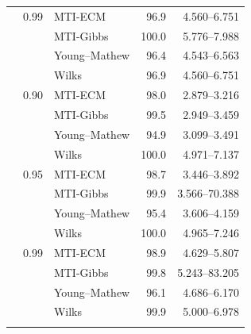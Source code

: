 \begin{longtable}{@{}rrlrr@{}}
\addlinespace[0.3em]
500 & 0.99 & MTI-ECM & 96.9 & 4.560--6.751 \\
 &  & MTI-Gibbs & 100.0 & 5.776--7.988 \\
 &  & Young--Mathew & 96.4 & 4.543--6.563 \\
 &  & Wilks & 96.9 & 4.560--6.751 \\
\addlinespace[0.3em]
1000 & 0.90 & MTI-ECM & 98.0 & 2.879--3.216 \\
 &  & MTI-Gibbs & 99.5 & 2.949--3.459 \\
 &  & Young--Mathew & 94.9 & 3.099--3.491 \\
 &  & Wilks & 100.0 & 4.971--7.137 \\
\addlinespace[0.3em]
1000 & 0.95 & MTI-ECM & 98.7 & 3.446--3.892 \\
 &  & MTI-Gibbs & 99.9 & 3.566--70.388 \\
 &  & Young--Mathew & 95.4 & 3.606--4.159 \\
 &  & Wilks & 100.0 & 4.965--7.246 \\
\addlinespace[0.3em]
1000 & 0.99 & MTI-ECM & 98.9 & 4.629--5.807 \\
 &  & MTI-Gibbs & 99.8 & 5.243--83.205 \\
 &  & Young--Mathew & 96.1 & 4.686--6.170 \\
 &  & Wilks & 99.9 & 5.000--6.978 \\
\addlinespace[0.3em]
\end{longtable}
\clearpage

